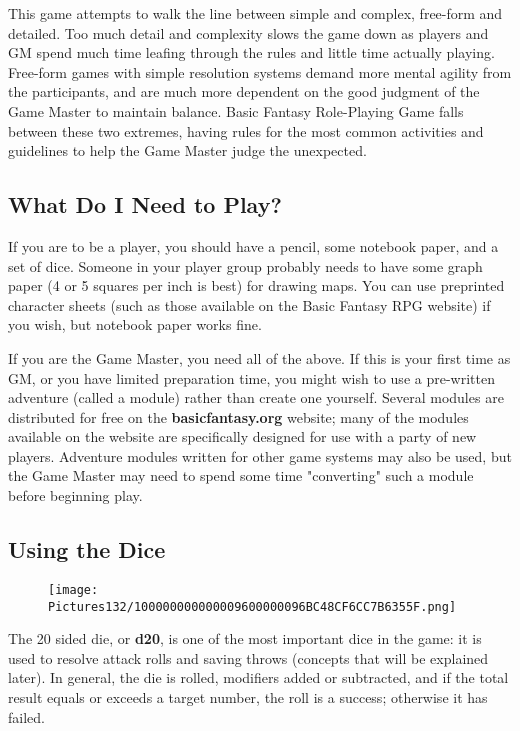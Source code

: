 \documentclass[a4paper,twoside,openany,10pt]{book}
\begin{document}
\begin{multicols}{2}
This game attempts to walk the line between simple and complex, free-form and detailed. Too much detail and complexity slows the game down as players and GM spend much time leafing through the rules and little time actually playing. Free-form games with simple resolution systems demand more mental agility from the participants, and are much more dependent on the good judgment of the Game Master to maintain balance. Basic Fantasy Role-Playing Game falls between these two extremes, having rules for the most common activities and guidelines to help the Game Master judge the unexpected.

\subsection{What Do I Need to Play?}\label{what-do-i-need-to-play}

If you are to be a player, you should have a pencil, some notebook paper, and a set of dice. Someone in your player group probably needs to have some graph paper (4 or 5 squares per inch is best) for drawing maps. You can use preprinted character sheets (such as those available on the Basic Fantasy RPG website) if you wish, but notebook paper works fine.

If you are the Game Master, you need all of the above. If this is your first time as GM, or you have limited preparation time, you might wish to use a pre-written adventure (called a module) rather than create one yourself. Several modules are distributed for free on the \textbf{basicfantasy.org} website; many of the modules available on the website are specifically designed for use with a party of new players. Adventure modules written for other game systems may also be used, but the Game Master may need to spend some time "converting" such a module before beginning play.

\bigskip

\subsection{Using the Dice}\label{using-the-dice}

\begin{wrapfigure}{r}{1.77cm}
	\texttt{[image: Pictures132/100000000000009600000096BC48CF6CC7B6355F.png]}
\end{wrapfigure}
The 20 sided die, or \textbf{d20}, is one of the most important dice in the
game: it is used to resolve attack rolls and saving throws (concepts
that will be explained later).  In general, the die is rolled, modifiers added or subtracted, and if the total result equals or exceeds a target number, the roll is a success; otherwise it has failed.


\end{multicols}
\end{document}
